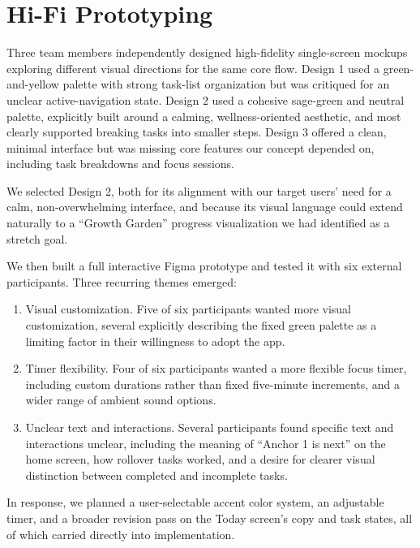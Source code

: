 \documentclass[sigplan,screen]{acmart}
\begin{document}
\section{Hi-Fi Prototyping}
Three team members independently designed high-fidelity single-screen mockups exploring different visual directions for the same core flow. Design 1 used a green-and-yellow palette with strong task-list organization but was critiqued for an unclear active-navigation state. Design 2 used a cohesive sage-green and neutral palette, explicitly built around a calming, wellness-oriented aesthetic, and most clearly supported breaking tasks into smaller steps. Design 3 offered a clean, minimal interface but was missing core features our concept depended on, including task breakdowns and focus sessions.

We selected Design 2, both for its alignment with our target users' need for a calm, non-overwhelming interface, and because its visual language could extend naturally to a ``Growth Garden'' progress visualization we had identified as a stretch goal.


We then built a full interactive Figma prototype and tested it with six external participants. Three recurring themes emerged:
\begin{enumerate}
  \item Visual customization. Five of six participants wanted more visual customization, several explicitly describing the fixed green palette as a limiting factor in their willingness to adopt the app.
  \item Timer flexibility. Four of six participants wanted a more flexible focus timer, including custom durations rather than fixed five-minute increments, and a wider range of ambient sound options.
  \item Unclear text and interactions. Several participants found specific text and interactions unclear, including the meaning of ``Anchor 1 is next'' on the home screen, how rollover tasks worked, and a desire for clearer visual distinction between completed and incomplete tasks.
\end{enumerate}

In response, we planned a user-selectable accent color system, an adjustable timer, and a broader revision pass on the Today screen's copy and task states, all of which carried directly into implementation.
\end{document}
